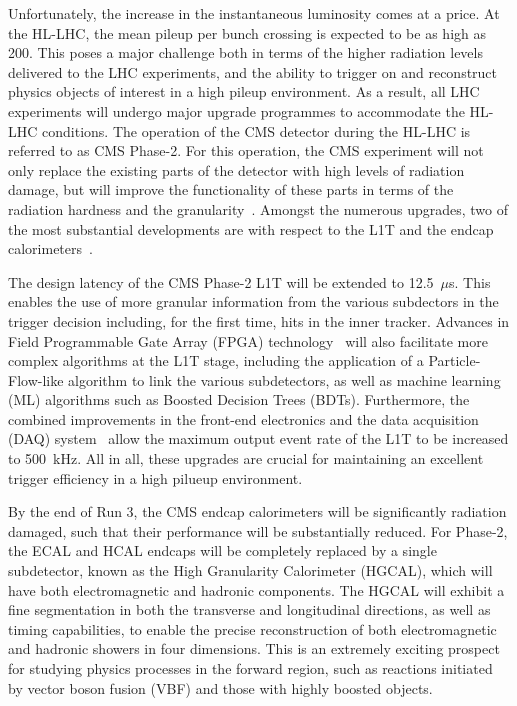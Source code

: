 Unfortunately, the increase in the instantaneous luminosity comes at a price. At the HL-LHC, the mean pileup per bunch crossing is expected to be as high as 200. This poses a major challenge both in terms of the higher radiation levels delivered to the LHC experiments, and the ability to trigger on and reconstruct physics objects of interest in a high pileup environment. As a result, all LHC experiments will undergo major upgrade programmes to accommodate the HL-LHC conditions. The operation of the CMS detector during the HL-LHC is referred to as CMS Phase-2. For this operation, the CMS experiment will not only replace the existing parts of the detector with high levels of radiation damage, but will improve the functionality of these parts in terms of the radiation hardness and the granularity~\cite{Contardo:2020886}. Amongst the numerous upgrades, two of the most substantial developments are with respect to the L1T and the endcap calorimeters~\cite{CERN-LHCC-2017-023,CERN-LHCC-2020-004}.

The design latency of the CMS Phase-2 L1T will be extended to 12.5~$\mu$s. This enables the use of more granular information from the various subdectors in the trigger decision including, for the first time, hits in the inner tracker. Advances in Field Programmable Gate Array (FPGA) technology~\cite{Duarte_2018}  will also facilitate more complex algorithms at the L1T stage, including the application of a Particle-Flow-like algorithm to link the various subdetectors, as well as machine learning (ML) algorithms such as Boosted Decision Trees (BDTs). Furthermore, the combined improvements in the front-end electronics and the data acquisition (DAQ) system~\cite{CERN-LHCC-2017-014} allow the maximum output event rate of the L1T to be increased to 500~kHz. All in all, these upgrades are crucial for maintaining an excellent trigger efficiency in a high pilueup environment.

By the end of Run 3, the CMS endcap calorimeters will be significantly radiation damaged, such that their performance will be substantially reduced. For Phase-2, the ECAL and HCAL endcaps will be completely replaced by a single subdetector, known as the High Granularity Calorimeter (HGCAL), which will have both electromagnetic and hadronic components. The HGCAL will exhibit a fine segmentation in both the transverse and longitudinal directions, as well as timing capabilities, to enable the precise reconstruction of both electromagnetic and hadronic showers in four dimensions. This is an extremely exciting prospect for studying physics processes in the forward region, such as reactions initiated by vector boson fusion (VBF) and those with highly boosted objects.

